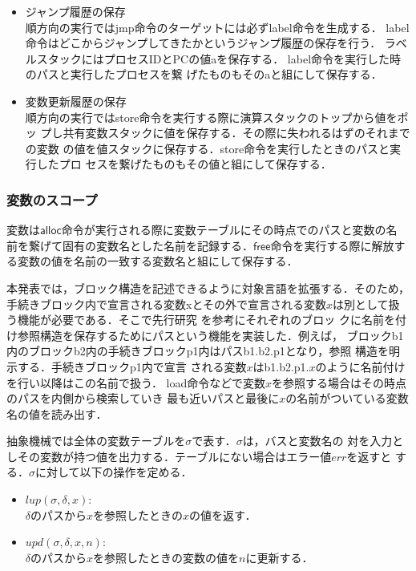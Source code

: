 \documentclass[submit,PRO]{ipsj}
\newcommand{\bcode}[1]{$\mathsf{#1}$}
\begin{document}
\begin{itemize}
 \item ジャンプ履歴の保存\\
順方向の実行ではjmp命令のターゲットには必ずlabel命令を生成する．
label命令はどこからジャンプしてきたかというジャンプ履歴の保存を行う．
ラベルスタックにはプロセスIDとPCの値aを保存する．
label命令を実行した時のパスと実行したプロセスを繋
げたものもそのaと組にして保存する．
\item 変数更新履歴の保存\\
順方向の実行ではstore命令を実行する際に演算スタックのトップから値をポッ
プし共有変数スタックに値を保存する．その際に失われるはずのそれまでの変数
の値を値スタックに保存する．store命令を実行したときのパスと実行したプロ
セスを繋げたものもその値と組にして保存する．
\end{itemize}

\subsubsection{変数のスコープ}

変数は\bcode{alloc}命令が実行される際に変数テーブルにその時点でのパスと変数の名
前を繋げて固有の変数名とした名前を記録する．\bcode{free}命令を実行する際に解放す
る変数の値を名前の一致する変数名と組にして保存する．

本発表では，ブロック構造を記述できるように対象言語を拡張する．そのため，
手続きブロック内で宣言される変数xとその外で宣言される変数$x$は別として扱
う機能が必要である．そこで先行研究
\cite{DBLP:journals/corr/abs-1808-08651,Hoey20PHD}を参考にそれぞれのブロッ
クに名前を付け参照構造を保存するためにパスという機能を実装した．例えば，
ブロックb1内のブロックb2内の手続きブロックp1内はパスb1.b2.p1となり，参照
構造を明示する．手続きブロックp1内で宣言
される変数$x$はb1.b2.p1.$x$のように名前付けを行い以降はこの名前で扱う．
load命令などで変数$x$を参照する場合はその時点のパスを内側から検索していき
最も近いパスと最後に$x$の名前がついている変数名の値を読み出す．

抽象機械では全体の変数テーブルを$\sigma$で表す．$\sigma$は，バスと変数名の
対を入力としその変数が持つ値を出力する．テーブルにない場合はエラー値$err$を返すと
する．$\sigma$に対して以下の操作を定める．
\begin{itemize}
 \item $lup(\sigma,\delta,x)$:\\
$\delta$のパスから$x$を参照したときの$x$の値を返す．


 \item $upd(\sigma,\delta,x,n)$:\\
$\delta$のパスから$x$を参照したときの変数の値を$n$に更新する．
\end{itemize}
\end{document}
